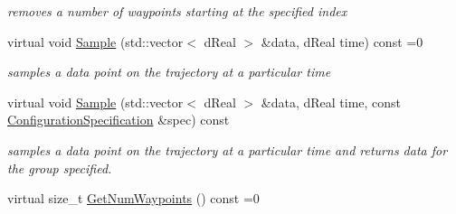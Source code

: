 \begin{DoxyCompactItemize}
\begin{DoxyCompactList}\small\item\em removes a number of waypoints starting at the specified index \item\end{DoxyCompactList}\item 
virtual void \hyperlink{classOpenRAVE_1_1TrajectoryBase_a479f3837904daa33d4e11e7fadd28aed}{Sample} (std::vector$<$ dReal $>$ \&data, dReal time) const =0
\begin{DoxyCompactList}\small\item\em samples a data point on the trajectory at a particular time \item\end{DoxyCompactList}\item 
virtual void \hyperlink{classOpenRAVE_1_1TrajectoryBase_acbaf4d3d503703e9d8274b73b880e969}{Sample} (std::vector$<$ dReal $>$ \&data, dReal time, const \hyperlink{classOpenRAVE_1_1ConfigurationSpecification}{ConfigurationSpecification} \&spec) const 
\begin{DoxyCompactList}\small\item\em samples a data point on the trajectory at a particular time and returns data for the group specified. \item\end{DoxyCompactList}\item 
\hypertarget{classOpenRAVE_1_1TrajectoryBase_aee0058cd9ab78480cbef78db3bf1fc75}{
virtual size\_\-t \hyperlink{classOpenRAVE_1_1TrajectoryBase_aee0058cd9ab78480cbef78db3bf1fc75}{GetNumWaypoints} () const =0}
\label{classOpenRAVE_1_1TrajectoryBase_aee0058cd9ab78480cbef78db3bf1fc75}


\end{DoxyCompactItemize}
